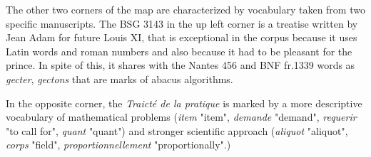 \documentclass[preprint]{elsarticle}
\begin{document}
The other two corners of the map are characterized by vocabulary taken from two specific manuscripts. The BSG 3143 in the up left corner is a treatise written by Jean Adam for future Louis XI, that is exceptional in the corpus because it uses Latin words and roman numbers and also because it had to be pleasant for the prince. In spite of this, it shares with the Nantes 456 and BNF fr.1339 words as \textit{gecter}, \textit{gectons} that are marks of abacus algorithms.


In the opposite corner, the \textit{Traicté de la pratique} is marked by a more descriptive vocabulary of mathematical problems (\textit{item} "item", \textit{demande} "demand", \textit{requerir} "to call for", \textit{quant} "quant")  and stronger scientific approach (\textit{aliquot} "aliquot", \textit{corps} "field", \textit{proportionnellement} "proportionally".)\\




\end{document}

